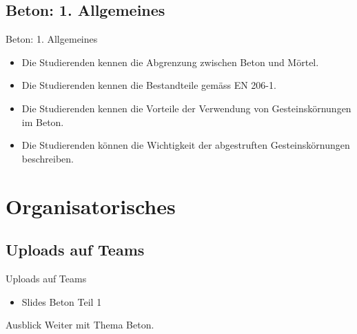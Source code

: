 \subsection{Beton: 1. Allgemeines}
\begin{frame}{Beton: 1. Allgemeines}
    \begin{myLernziele}
        \begin{itemize}
            \item[\textbullet] Die Studierenden kennen die Abgrenzung zwischen Beton und Mörtel.
            \item[\textbullet] Die Studierenden kennen die Bestandteile gemäss EN 206-1.
            \item[\textbullet] Die Studierenden kennen die Vorteile der Verwendung von Gesteinskörnungen im Beton.
            \item[\textbullet] Die Studierenden können die Wichtigkeit der abgestruften Gesteinskörnungen beschreiben.
        \end{itemize}
    \end{myLernziele}
\end{frame}


\section{Organisatorisches}
\BlueSectionSlide

\subsection{Uploads auf Teams}
\begin{frame}{Uploads auf Teams}
    \begin{itemize}
        \item[\textbullet] Slides Beton Teil 1
    \end{itemize}

\end{frame}




\begin{frame}{Ausblick}
    Weiter mit Thema Beton.

\end{frame}


